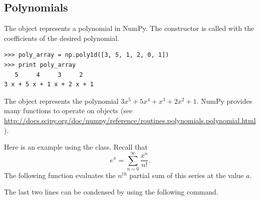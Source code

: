 \subsection*{Polynomials}
The  object represents a polynomial in NumPy. The constructor is called with the coefficients of the desired polynomial. 

\begin{lstlisting}
>>> poly_array = np.poly1d([3, 5, 1, 2, 0, 1])
>>> print poly_array
   5     4     3     2
3 x + 5 x + 1 x + 2 x + 1
\end{lstlisting}

The object  represents the polynomial $3x^5+5x^4+x^3+2x^2+1$.
NumPy provides many functions to operate on  objects (see \url{http://docs.scipy.org/doc/numpy/reference/routines.polynomials.polynomial.html}).

Here is an example using the  class. Recall that
\[
e^x = \sum_{n=0}^{\infty} \frac{x^n}{n!}.
\]
The following function evaluates the $n^{th}$ partial sum of this series at the value $a$.

The last two lines can be condensed by using the following command.

